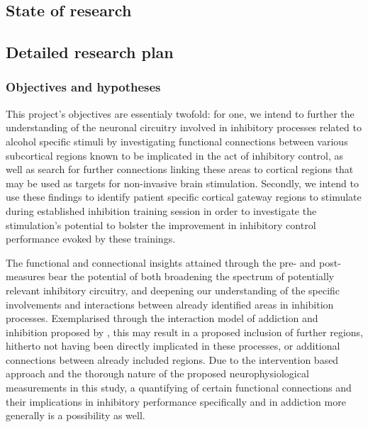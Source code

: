 \documentclass[12pt]{article}
\begin{document}
\subsection{State of research}


\subsection{Detailed research plan}


\subsubsection{Objectives and hypotheses}

This project's objectives are essentialy twofold: for one, we intend to further the understanding of the neuronal circuitry involved in inhibitory processes related to alcohol specific stimuli by investigating functional connections between various subcortical regions known to be implicated in the act of inhibitory control, as well as search for further connections linking these areas to cortical regions that may be used as targets for non-invasive brain stimulation. Secondly, we intend to use these findings to identify patient specific cortical gateway regions to stimulate during established inhibition training session in order to investigate the stimulation's potential to bolster the improvement in inhibitory control performance evoked by these trainings.

The functional and connectional insights attained through the pre- and post-measures bear the potential of both broadening the spectrum of potentially relevant inhibitory circuitry, and deepening our understanding of the specific involvements and interactions between already identified areas in inhibition processes. Exemplarised through the interaction model of addiction and inhibition proposed by \textcite{volkowAddictionScienceUncovering2014}, this may result in a proposed inclusion of further regions, hitherto not having been directly implicated in these processes, or additional connections between already included regions. Due to the intervention based approach and the thorough nature of the proposed neurophysiological measurements in this study, a quantifying of certain functional connections and their implications in inhibitory performance specifically and in addiction more generally is a possibility as well.
\end{document}
